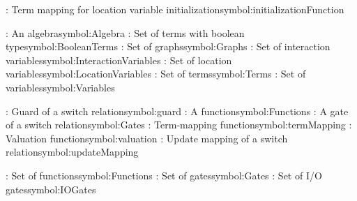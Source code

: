 \begin{tabbing}
\addsymbol \initializationFunction: {Term mapping for location variable initialization}{symbol:initializationFunction}

\addsymbol \Algebra: {An algebra}{symbol:Algebra}
\addsymbol \BooleanTerms: {Set of terms with boolean type}{symbol:BooleanTerms}
\addsymbol \Graphs: {Set of graphs}{symbol:Graphs}
\addsymbol \InteractionVariables: {Set of interaction variables}{symbol:InteractionVariables}
\addsymbol \LocationVariables: {Set of location variables}{symbol:LocationVariables}
\addsymbol \Terms: {Set of terms}{symbol:Terms}
\addsymbol \Variables: {Set of variables}{symbol:Variables}

\addsymbol \guard: {Guard of a switch relation}{symbol:guard}
\addsymbol \function: {A function}{symbol:Functions}
\addsymbol \gate: {A gate of a switch relation}{symbol:Gates}
\addsymbol \termMapping: {Term-mapping function}{symbol:termMapping}
\addsymbol \valuation: {Valuation function}{symbol:valuation}
\addsymbol \updateMapping: {Update mapping of a switch relation}{symbol:updateMapping}

\addsymbol \Functions: {Set of functions}{symbol:Functions}
\addsymbol \Gates: {Set of gates}{symbol:Gates}
\addsymbol \IOGates: {Set of I/O gates}{symbol:IOGates}

\end{tabbing}
